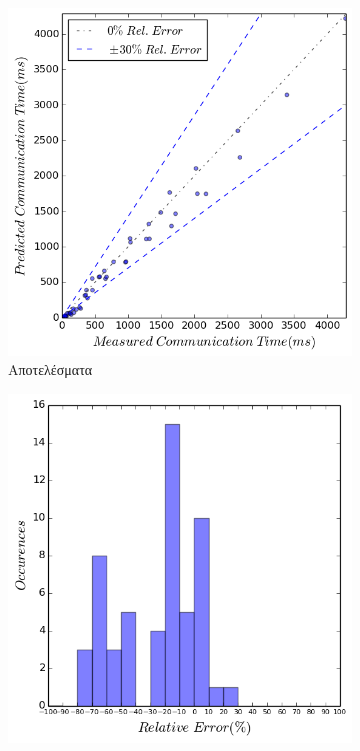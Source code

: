 \begin{figure}[ht]
    \centering
    \captionsetup{justification=centering,margin=0cm,font=footnotesize}
    \begin{subfigure}[b]{0.47\textwidth}
        \includegraphics[width=\textwidth]{./images/NB+cg_UMA/NB_cg_jacobi_res.png}
        \caption{Αποτελέσματα}
        \label{fig:NB_cg_jacobi_UMA_res}
    \end{subfigure}
    \quad %
    \begin{subfigure}[b]{0.47\textwidth}
        \includegraphics[width=\textwidth]{./images/NB+cg_UMA/NB_cg_jacobi_err_dist.png}

\end{subfigure}
\end{figure}
